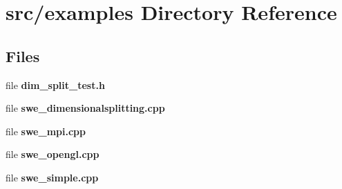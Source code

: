 \section{src/examples Directory Reference}
\label{dir_e931c1a3f0014e624d0645a271726ad2}
\subsection*{Files}
\begin{DoxyCompactItemize}
\item 
file {\bf dim\-\_\-split\-\_\-test.\-h}
\item 
file {\bfseries swe\-\_\-dimensionalsplitting.\-cpp}
\item 
file {\bf swe\-\_\-mpi.\-cpp}
\item 
file {\bfseries swe\-\_\-opengl.\-cpp}
\item 
file {\bf swe\-\_\-simple.\-cpp}
\end{DoxyCompactItemize}
